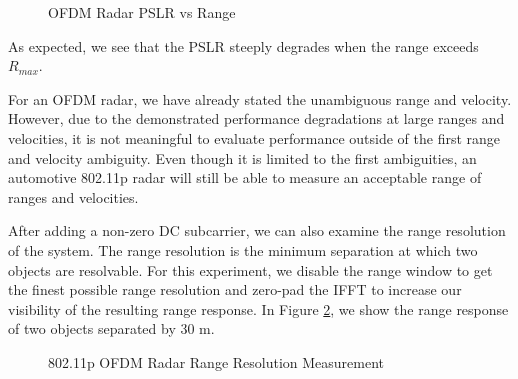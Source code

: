 \documentclass[conference]{IEEEtran}
\begin{document}
\begin{figure}[H]
\centering
{}
\caption{OFDM Radar PSLR vs Range}
\label{fig::ofdm_radar_pslr_vs_range}
\end{figure}

As expected, we see that the PSLR steeply degrades when the range exceeds $R_{max}$.

For an OFDM radar, we have already stated the unambiguous range and velocity. However, due to the demonstrated performance degradations at large ranges and velocities, it is not meaningful to evaluate performance outside of the first range and velocity ambiguity. Even though it is limited to the first ambiguities, an automotive 802.11p radar will still be able to measure an acceptable range of ranges and velocities.

After adding a non-zero DC subcarrier, we can also examine the range resolution of the system. The range resolution is the minimum separation at which two objects are resolvable. For this experiment, we disable the range window to get the finest possible range resolution and zero-pad the IFFT to increase our visibility of the resulting range response. In Figure \ref{fig::ofdm_radar_range_resolution}, we show the range response of two objects separated by 30 m.

\begin{figure}[H]
\centering
{}
\caption{802.11p OFDM Radar Range Resolution Measurement}
\label{fig::ofdm_radar_range_resolution}
\end{figure}
\end{document}
